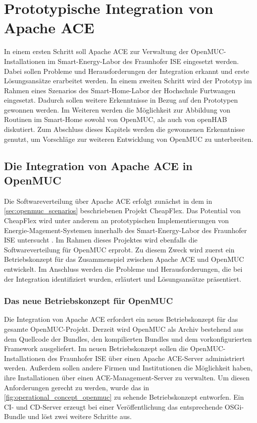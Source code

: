 \chapter{Prototypische Integration von Apache ACE}
\label{cha:prototype}
In einem ersten Schritt soll Apache ACE zur Verwaltung der OpenMUC-Installationen im Smart-Energy-Labor des Fraunhofer \ac{ISE} eingesetzt werden.
Dabei sollen Probleme und Herausforderungen der Integration erkannt und erste Lösungsansätze erarbeitet werden.
In einem zweiten Schritt wird der Prototyp im Rahmen eines Szenarios des Smart-Home-Labor der Hochschule Furtwangen eingesetzt.
Dadurch sollen weitere Erkenntnisse in Bezug auf den Prototypen gewonnen werden. 
Im Weiteren werden die Möglichkeit zur Abbildung von Routinen im Smart-Home sowohl von OpenMUC, als auch von openHAB diskutiert.
Zum Abschluss dieses Kapitels werden die gewonnenen Erkenntnisse genutzt, um Vorschläge zur weiteren Entwicklung von OpenMUC zu unterbreiten. 

\section{Die Integration von Apache ACE in OpenMUC}
\label{sec:integration_ace}
Die Softwareverteilung über Apache ACE erfolgt zunächst in dem in \autoref{sec:openmuc_scenarios} beschriebenen Projekt CheapFlex.
Das Potential von CheapFlex wird unter anderem an prototypischen Implementierungen von Energie-Magement-Systemen innerhalb des Smart-Energy-Labor des Fraunhofer \ac{ISE} untersucht \cite{cheapflex}.
Im Rahmen dieses Projektes wird ebenfalls die Softwareverteilung für OpenMUC erprobt. Zu diesem Zweck wird zuerst ein Betriebskonzept für das Zusammenspiel zwischen Apache ACE und OpenMUC
entwickelt. Im Anschluss werden die Probleme und Herausforderungen, die bei der Integration identifiziert wurden, erläutert und Lösungsansätze präsentiert.

\subsection{Das neue Betriebskonzept für OpenMUC}
\label{subsec:operational_concept}

Die Integration von Apache ACE erfordert ein neues Betriebskonzept für das gesamte OpenMUC-Projekt. 
Derzeit wird OpenMUC als Archiv bestehend aus dem Quellcode der Bundles, den kompilierten Bundles und dem vorkonfigurierten
Framework ausgeliefert.
Im neuen Betriebskonzept sollen die OpenMUC-Installationen des Fraunhofer ISE über einen Apache ACE-Server administriert werden.
Außerdem sollen andere Firmen und Institutionen die Möglichkeit haben, ihre Installationen über einen ACE-Management-Server zu verwalten.
Um diesen Anforderungen gerecht zu werden, wurde das in \autoref{fig:operational_concept_openmuc} zu sehende Betriebskonzept entworfen.
Ein \ac{CI}- und \ac{CD}-Server erzeugt bei einer Veröffentlichung das entsprechende \ac{OSGi}-Bundle und löst zwei weitere Schritte aus.

